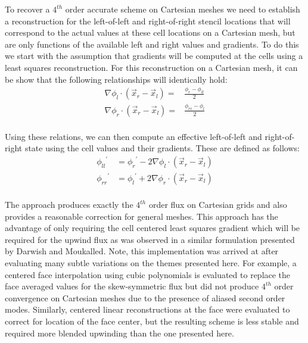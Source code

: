 To recover a $4^{th}$ order accurate scheme on Cartesian meshes we
need to establish a reconstruction for the left-of-left and
right-of-right stencil locations that will correspond to the actual
values at these cell locations on a Cartesian mesh, but are only
functions of the available left and right values and gradients.  To do
this we start with the assumption that gradients will be computed at
the cells using a least squares reconstruction.  For this
reconstruction on a Cartesian mesh, it can be show that the following
relationships will identically hold:
\begin{equation}
\begin{aligned}
\nabla \phi_l \cdot (\vec{x}_r-\vec{x}_l) = &\frac{\phi_{r}-\phi_{ll}}{2}\\
\nabla \phi_r \cdot (\vec{x}_r-\vec{x}_l) = &\frac{\phi_{rr}-\phi_{l}}{2}\\
\end{aligned}
\end{equation}

Using these relations, we can then compute an effective left-of-left
and right-of-right state using the cell values and their gradients.
These are defined as follows:
\begin{equation}
\begin{aligned}
{\phi_{ll}}^{'} &= {\phi_r}^{'} - 2 \nabla \phi_l \cdot (\vec{x}_r-\vec{x}_l) \\
{\phi_{rr}}^{'} &= {\phi_l}^{'} + 2 \nabla \phi_r \cdot (\vec{x}_r-\vec{x}_l) \\
\end{aligned}
\end{equation}

The approach produces exactly the $4^{th}$ order flux on Cartesian
grids and also provides a reasonable correction for general meshes.
This approach has the advantage of only requiring the cell centered
least squares gradient which will be required for the upwind flux as
was observed in a similar formulation presented by Darwish and
Moukalled\cite{Darwish.2003}.  Note, this implementation was arrived at
after evaluating many subtle variations on the themes presented here.
For example, a centered face interpolation using cubic polynomials is
evaluated to replace the face averaged values for the skew-symmetric
flux but did not produce $4^{th}$ order convergence on Cartesian
meshes due to the presence of aliased second order modes.  Similarly,
centered linear reconstructions at the face were evaluated to correct
for location of the face center, but the resulting scheme is less
stable and required more blended upwinding than the one presented
here.


